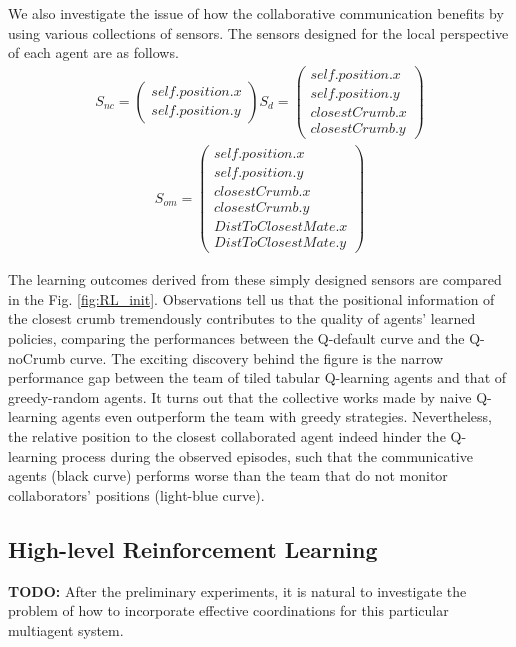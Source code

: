 \documentclass[conference]{IEEEtran}
\begin{document}
We also investigate the issue of how the collaborative communication benefits
by using various collections of sensors.
The sensors designed for the local perspective of each agent are as follows. 
\begin{align}
    S_{nc} = \left( \begin{array}{c}
      self.position.x \\
      self.position.y 
  \end{array} \right)
    S_{d} = \left( \begin{array}{c}
      self.position.x \\
      self.position.y \\
      closestCrumb.x \\
      closestCrumb.y 
  \end{array} \right)
    \nonumber
\end{align}
\begin{align}
        S_{om} = \left( \begin{array}{c}
      self.position.x \\
      self.position.y \\
      closestCrumb.x \\
      closestCrumb.y  \\
      DistToClosestMate.x \\
      DistToClosestMate.y 
  \end{array} \right)
        \nonumber
\end{align}

The learning outcomes derived from these simply designed sensors are compared
in the Fig. \ref{fig:RL_init}. 
Observations tell us that the positional information of the closest crumb
tremendously contributes to the quality of agents' learned policies, comparing
the performances between the Q-default curve and the Q-noCrumb curve. 
 The exciting discovery behind the figure is the narrow performance gap
 between the team of tiled tabular Q-learning agents and that of greedy-random
 agents. It turns out that the collective works made by naive Q-learning
 agents even outperform the team with greedy strategies.
Nevertheless, the relative position to the closest collaborated agent indeed
hinder the Q-learning process during the observed episodes, such that the
communicative agents (black curve) performs worse than the team that do not
monitor collaborators' positions (light-blue curve).

\subsection{High-level Reinforcement Learning}
\textbf{TODO:}
After the preliminary experiments, it is natural to investigate the problem of how
to incorporate effective coordinations for this particular multiagent system.
\end{document}
